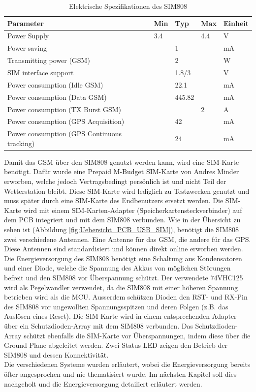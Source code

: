 \begin{table}[h]
\centering
  \caption{Elektrische Spezifikationen des SIM808 \cite{SIM808}}
\begin{tabular}{lllll}
\toprule 
\textbf{Parameter} & \textbf{Min} & \textbf{Typ} & \textbf{Max} & \textbf{Einheit} \\ 
\midrule 
Power Supply & 3.4 &  & 4.4 & V \\ 
Power saving &  & 1 &  & mA \\ 
Transmitting power (GSM) &  & 2 &  & W \\ 
SIM interface support &  & 1.8/3 &  & V \\ 
Power consumption (Idle GSM) &  & 22.1 &  & mA \\
Power consumption (Data GSM) &  & 445.82 &  & mA \\
Power consumption (TX Burst GSM) &  &  & 2 & A \\
Power consumption (GPS Acquisition) &  & 42 &  & mA \\ 
Power consumption (GPS Continuous tracking) &  & 24 &  & mA \\ 
\bottomrule
\end{tabular} 
\label{tab:SIM808} 
\end{table}

Damit das GSM über den SIM808 genutzt werden kann, wird eine SIM-Karte benötigt. Dafür wurde eine Prepaid M-Budget SIM-Karte von Andres Minder erworben, welche jedoch Vertragsbedingt persönlich ist und nicht Teil der Wetterstation bleibt. Diese SIM-Karte wird lediglich zu Testzwecken genutzt und muss später durch eine SIM-Karte des Endbenutzers ersetzt werden. Die SIM-Karte wird mit einem SIM-Karten-Adapter (Speicherkartensteckverbinder) auf dem PCB integriert und mit dem SIM808 verbunden.
\newpage
Wie in der Übersicht zu sehen ist (Abbildung \ref{fig:Uebersicht_PCB_USB_SIM}), benötigt die SIM808 zwei verschiedene Antennen. Eine Antenne für das GSM, die andere für das GPS. Diese Antennen sind standardisiert und können direkt online erworben werden. Die Energieversorgung des SIM808 benötigt eine Schaltung aus Kondensatoren und einer Diode, welche die Spannung des Akkus von möglichen Störungen befreit und den SIM808 vor Überspannung schützt. Der verwendete 74VHC125 wird als Pegelwandler verwendet, da die SIM808 mit einer höheren Spannung betrieben wird als die MCU. Ausserdem schützen Dioden den RST- und RX-Pin des SIM808 vor ungewollten Spannungsspitzen und deren Folgen (z.B. das Auslösen eines Reset). Die SIM-Karte wird in einem entsprechenden Adapter über ein Schutzdioden-Array mit dem SIM808 verbunden. Das Schutzdioden-Array schützt ebenfalls die SIM-Karte vor Überspannungen, indem diese über die Ground-Plane abgeleitet werden. Zwei Status-LED zeigen den Betrieb der SIM808 und dessen Konnektivität.\\[0.5cm]
Die verschiedenen Systeme wurden erläutert, wobei die Energieversorgung bereits öfter angesprochen und nie thematisiert wurde. Im nächsten Kapitel soll dies nachgeholt und die Energieversorgung detailiert erläutert werden.

